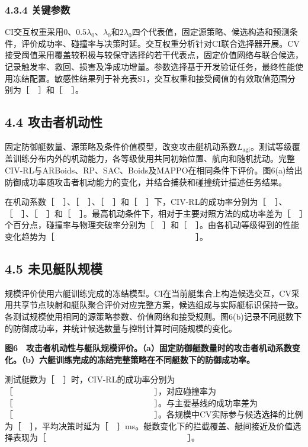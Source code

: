 \documentclass[
  11pt,
  fontset=none]{ctexart}
\newcommand{\blankresultfigure}{\par\Needspace{58mm}\begin{center}\setlength{\fboxsep}{0pt}\fbox{\rule{0pt}{32mm}\rule{.96\linewidth}{0pt}}\end{center}\par\nopagebreak[4]}
\begin{document}
\subsubsection{4.3.4 关键参数}\label{ux5173ux952eux53c2ux6570}

CI交互权重采用\(0\)、\(0.5\lambda_0\)、\(\lambda_0\)和\(2\lambda_0\)四个代表值，固定源策略、候选构造和预测条件，评价成功率、碰撞率与决策时延。交互权重分析针对CI联合选择器开展。CV接受阈值采用覆盖较积极与较保守选择的若干代表点，固定价值网络与联合候选，记录触发率、救回、损害及净成功增量。参数选择基于开发验证任务，最终性能使用冻结配置。敏感性结果列于补充表S1，交互权重和接受阈值的有效取值范围分别为［　］和［　］。

\subsection{4.4
攻击者机动性}\label{ux653bux51fbux8005ux673aux52a8ux6027}

固定防御艇数量、源策略及条件价值模型，改变攻击艇机动系数\(L_{\mathrm{agi}}\)。测试等级覆盖训练分布内外的机动能力，各等级使用共同初始位置、航向和随机扰动。完整CIV-RL与ARBoids、RP、SAC、Boids及MAPPO在相同条件下评价。图6(a)给出防御成功率随攻击者机动能力的变化，并结合捕获和碰撞统计描述任务结果。

在机动系数［　］、［　］、［　］和［　］下，CIV-RL的成功率分别为［　］、［　］、［　］和［　］。最高机动条件下，相对于主要对照方法的成功率差为［　］个百分点，碰撞率与物理突破率分别为［　］和［　］。由各机动等级得到的性能变化趋势为［　　　　　　　　　　　　　　　　　］。

\subsection{4.5
未见艇队规模}\label{ux672aux89c1ux8247ux961fux89c4ux6a21}

规模评价使用六艇训练完成的冻结模型。CI在当前艇集合上构造候选交互，CV采用共享节点映射和艇队聚合评价对应完整方案，候选组成与实际艇标识保持一致。各测试规模使用相同的源策略参数、价值网络和接受规则。图6(b)记录不同艇数下的防御成功率，并统计候选数量与控制计算时间随规模的变化。

\blankresultfigure

\textbf{图6　攻击者机动性与艇队规模评价。（a）固定防御艇数量时的攻击者机动系数变化。（b）六艇训练完成的冻结完整策略在不同艇数下的防御成功率。}

测试艇数为［　］时，CIV-RL的成功率分别为［　　　　　　　　　　　　　　　　　］，对应碰撞率为［　　　　　　　　　　　　　　　　　］。与主要基线的成功率差为［　　　　　　　　　　　　　　　　　］。各规模中CV实际参与候选选择的比例为［　］，平均决策时延为［　］ms。艇数变化下的拦截覆盖、艇间接近及价值选择表现为［　　　　　　　　　　　　　　　　　］。
\end{document}
